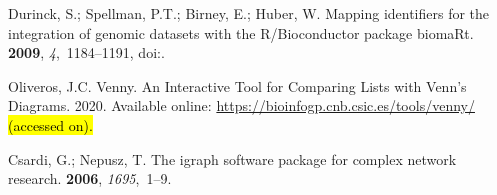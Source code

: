 \documentclass[ijms,article,accept,moreauthors,pdftex]{Definitions/mdpi}
\begin{document}
\begin{thebibliography}{999}
Durinck, S.; Spellman, P.T.; Birney, E.; Huber, W.
\newblock Mapping identifiers for the integration of genomic datasets with the
  R/Bioconductor package {biomaRt}.
 {\bf 2009}, {\em 4},~1184--1191,
\newblock
  doi:{\href{https://doi.org/10.1038/nprot.2009.97}{}}.

Oliveros, J.C.
\newblock Venny. An Interactive Tool for Comparing Lists with Venn's Diagrams.  2020.
\newblock Available online: \url{https://bioinfogp.cnb.csic.es/tools/venny/} \hl{(accessed on). } %

Csardi, G.; Nepusz, T. 
\newblock The igraph software package for complex network research.
 {\bf 2006}, {\em 1695},~1--9.

\end{thebibliography}

\end{document}
